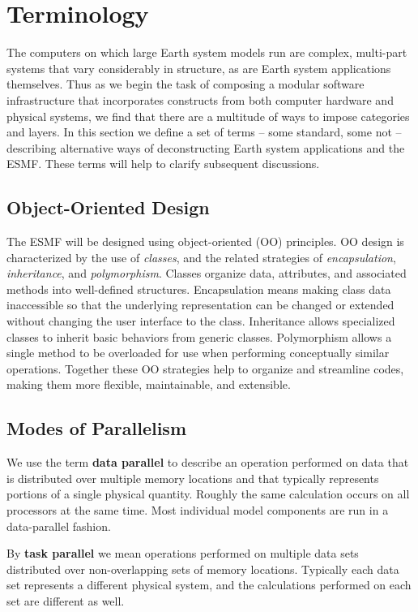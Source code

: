 \section{Terminology}

The computers on which large Earth system models run are complex, multi-part
systems that vary considerably in structure, as are Earth system applications 
themselves.  Thus as we begin the task of composing a modular software
infrastructure that incorporates constructs from both computer hardware 
and physical systems, we find that there are a multitude of ways to impose 
categories and layers.  In this section we define a set of terms -- some standard,
some not -- describing alternative ways of deconstructing Earth system applications
and the ESMF.  These terms will help to clarify subsequent discussions.

\subsection{Object-Oriented Design}

The ESMF will be designed using object-oriented (OO) principles.  OO design
is characterized by the use of {\it classes}, and the related strategies of
{\it encapsulation}, {\it inheritance}, and {\it polymorphism}.  Classes 
organize data, attributes, and associated methods into well-defined structures.
Encapsulation means making class data inaccessible so that the underlying representation
can be changed or extended without changing the user interface to the class.
Inheritance allows specialized classes to inherit basic behaviors from generic
classes.  Polymorphism allows a single method to be overloaded for use 
when performing conceptually similar operations.  Together these OO
strategies help to organize and streamline codes, making them more flexible,
maintainable, and extensible.

\subsection{Modes of Parallelism}

We use the term {\bf data parallel} to describe an operation performed
on data that is distributed over multiple memory locations and that typically
represents portions of a single physical quantity.  Roughly the same
calculation occurs on all processors at the same time.  Most individual 
model components are run in a data-parallel fashion.

By {\bf task parallel} we mean operations performed on multiple data sets 
distributed over non-overlapping sets of memory locations.  Typically 
each data 
set represents a different physical system, and the calculations performed
on each set are different as well.

